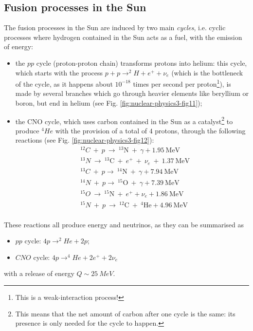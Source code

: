 \subsection{Fusion processes in the Sun}
The fusion processes in the Sun are induced by two main \emph{cycles}, i.e. cyclic processes where hydrogen contained in the Sun acts as a fuel, with the emission of energy:
\begin{itemize}
    \item the \(pp\) cycle (proton-proton chain) transforms protons into helium: this cycle, which starts with the process \(p+p\to^2H+e^++\nu_e\) (which is the bottleneck of the cycle, as it happens about \(10^{-18}\) times per second per proton\footnote{This is a weak-interaction process!}), is made by several branches which go through heavier elements like beryllium or boron, but end in helium (see Fig. \ref{fig:nuclear-physics3-fig11});
    \item the CNO cycle, which uses carbon contained in the Sun as a catalyst\footnote{This means that the net amount of carbon after one cycle is the same: its presence is only needed for the cycle to happen.} to produce \(^{4}He\) with the provision of a total of \(4\) protons, through the following reactions (see Fig. \ref{fig:nuclear-physics3-fig12}):
    \begin{equation*}
    \begin{split}
        &^{12}C~+~p ~ \rightarrow ~ ^{13}\mbox{N}~+~\gamma + 1.95~\mbox{MeV}\\
        &^{13}N ~ \rightarrow ~ ^{13}\mbox{C}~+~ e^+ ~+~ \nu_e ~+~ 1.37~\mbox{MeV}\\
        &^{13}C ~+~p \rightarrow ~ ^{14}\mbox{N}~+~\gamma + 7.94~\mbox{MeV}\\
        &^{14}N ~+~p \rightarrow ~ ^{15}\mbox{O}~+~\gamma + 7.39~\mbox{MeV}\\
        &^{15}O ~\rightarrow ~ ^{15}\mbox{N}~+~ e^+ + \nu_e + 1.86~\mbox{MeV}\\
        &^{15}N ~+~ p ~\rightarrow ~ ^{12}\mbox{C}~+~ ^{4}\mbox{He} + 4.96~\mbox{MeV}\\
    \end{split}
    \end{equation*}
\end{itemize}
These reactions all produce energy and neutrinos, as they can be summarised as
\begin{itemize}
    \item \(pp\) cycle: \(4p\to ^2He+2p\);
    \item \(CNO\) cycle: \(4p\to ^4He+2e^++2\nu_e\) 
\end{itemize}
with a release of energy \(Q\sim\SI{25}{MeV}\). 

